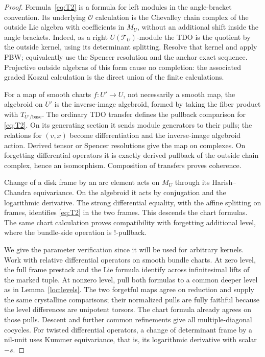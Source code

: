 \begin{proof}
Formula~\eqref{eq:T2} is a formula for left modules in the
angle-bracket convention.  Its underlying $\mathcal O$ calculation is
the Chevalley chain complex of the outside Lie algebra with
coefficients in $M_U$, without an additional shift inside the
angle brackets.  Indeed, as a right $U(\mathcal T_U)$-module the TDO is
the quotient by the outside kernel, using its determinant splitting.
Resolve that kernel and apply PBW; equivalently use the Spencer
resolution and the anchor exact sequence.  Projective outside
algebras of this form cause no completion: the associated graded Koszul
calculation is the direct union of the finite calculations.

For a map of smooth charts $f:U'\to U$, not necessarily a smooth map,
the algebroid on $U'$ is the inverse-image algebroid, formed by taking
the fiber product with $T_{U'/\mathrm{base}}$.  The ordinary TDO
transfer defines the pullback comparison for \eqref{eq:T2}.  On its
generating section it sends module generators to their pulls; the
relations for $(v,x)$ become differentiation and the inverse-image
algebroid action.  Derived tensor or Spencer resolutions give the
map on complexes.  On forgetting differential operators it is exactly
derived pullback of the outside chain complex, hence an isomorphism.
Composition of transfers proves coherence.

Change of a disk frame by an arc element acts on $M_U$ through its
Harish--Chandra equivariance.  On the algebroid it acts by conjugation
and the logarithmic derivative.  The strong differential equality,
with the affine splitting on frames, identifies \eqref{eq:T2} in the
two frames.  This descends the chart formulas.  The same chart
calculation proves compatibility with forgetting additional level,
where the bundle-side operation is $!$-pullback.

We give the parameter verification since it will be used for arbitrary
kernels.  Work with relative differential operators on smooth bundle
charts.  At zero level, the full frame prestack and the Lie formula
identify across infinitesimal lifts of the marked tuple.  At nonzero
level, pull both formulas to a common deeper level as in
Lemma~\ref{loc:levels}.  The two forgetful maps agree on reduction and
supply the same crystalline comparisons; their normalized pulls are
fully faithful because the level differences are unipotent torsors.
The chart formula already agrees on those pulls.  Descent and further
common refinements give all multiple-diagonal cocycles.  For twisted
differential operators, a change of determinant frame by a nil-unit
uses Kummer equivariance, that is, its logarithmic derivative with
scalar $-s$.


\end{proof}
